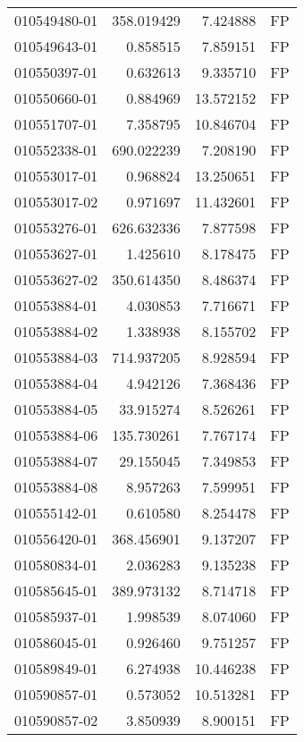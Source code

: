\begin{tabular}{lrrl}
010549480-01 &  358.019429 &       7.424888 &   FP \\
010549643-01 &    0.858515 &       7.859151 &   FP \\
010550397-01 &    0.632613 &       9.335710 &   FP \\
010550660-01 &    0.884969 &      13.572152 &   FP \\
010551707-01 &    7.358795 &      10.846704 &   FP \\
010552338-01 &  690.022239 &       7.208190 &   FP \\
010553017-01 &    0.968824 &      13.250651 &   FP \\
010553017-02 &    0.971697 &      11.432601 &   FP \\
010553276-01 &  626.632336 &       7.877598 &   FP \\
010553627-01 &    1.425610 &       8.178475 &   FP \\
010553627-02 &  350.614350 &       8.486374 &   FP \\
010553884-01 &    4.030853 &       7.716671 &   FP \\
010553884-02 &    1.338938 &       8.155702 &   FP \\
010553884-03 &  714.937205 &       8.928594 &   FP \\
010553884-04 &    4.942126 &       7.368436 &   FP \\
010553884-05 &   33.915274 &       8.526261 &   FP \\
010553884-06 &  135.730261 &       7.767174 &   FP \\
010553884-07 &   29.155045 &       7.349853 &   FP \\
010553884-08 &    8.957263 &       7.599951 &   FP \\
010555142-01 &    0.610580 &       8.254478 &   FP \\
010556420-01 &  368.456901 &       9.137207 &   FP \\
010580834-01 &    2.036283 &       9.135238 &   FP \\
010585645-01 &  389.973132 &       8.714718 &   FP \\
010585937-01 &    1.998539 &       8.074060 &   FP \\
010586045-01 &    0.926460 &       9.751257 &   FP \\
010589849-01 &    6.274938 &      10.446238 &   FP \\
010590857-01 &    0.573052 &      10.513281 &   FP \\
010590857-02 &    3.850939 &       8.900151 &   FP \\

\end{tabular}
